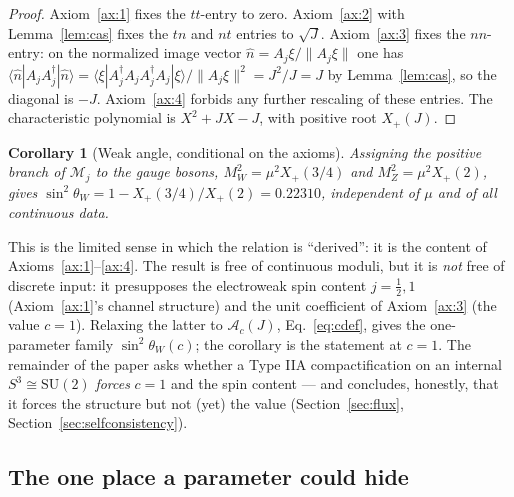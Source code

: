 \documentclass[11pt]{article}
\theoremstyle{plain}
\newtheorem{corollary}[theorem]{Corollary}
\theoremstyle{definition}
\newcommand{\cA}{\mathcal{A}}
\newcommand{\cM}{\mathcal{M}}
\newcommand{\Xp}{X_{+}}
\newcommand{\sinsq}{\sin^{2}\theta_W}
\newcommand{\SU}{\mathrm{SU}}
\begin{document}
\begin{proof}
Axiom~\ref{ax:1} fixes the $tt$-entry to zero. Axiom~\ref{ax:2} with
Lemma~\ref{lem:cas} fixes the $tn$ and $nt$ entries to $\sqrt J$.
Axiom~\ref{ax:3} fixes the $nn$-entry: on the normalized image vector
$\hat n=A_j\xi/\|A_j\xi\|$ one has
$\langle\hat n|A_jA_j^{\dagger}|\hat n\rangle
=\langle\xi|A_j^{\dagger}A_jA_j^{\dagger}A_j|\xi\rangle/\|A_j\xi\|^2
=J^2/J=J$ by Lemma~\ref{lem:cas}, so the diagonal is $-J$.
Axiom~\ref{ax:4} forbids any further rescaling of these entries. The
characteristic polynomial is $X^2+JX-J$, with positive root $\Xp(J)$.
\end{proof}

\begin{corollary}[Weak angle, conditional on the axioms]
\label{cor:angle}
Assigning the positive branch of $\cM_j$ to the gauge bosons,
$M_W^2=\mu^2\Xp(3/4)$ and $M_Z^2=\mu^2\Xp(2)$, gives
$\sinsq=1-\Xp(3/4)/\Xp(2)=0.22310$, independent of $\mu$ and of all
\emph{continuous} data.
\end{corollary}

This is the limited sense in which the relation
is ``derived'': it is the content of Axioms~\ref{ax:1}--\ref{ax:4}. The
result is free of continuous moduli, but it is \emph{not} free of discrete
input: it presupposes the electroweak spin content $j=\tfrac12,1$
(Axiom~\ref{ax:1}'s channel structure) and the unit coefficient of
Axiom~\ref{ax:3} (the value $c=1$). Relaxing the latter to
$\cA_c(J)$, Eq.~\eqref{eq:cdef}, gives the one-parameter family
$\sin^2\theta_W(c)$; the corollary is the statement at $c=1$. The remainder
of the paper asks whether a Type IIA compactification on an internal
$S^3\cong\SU(2)$ \emph{forces} $c=1$ and the spin content --- and concludes,
honestly, that it forces the structure but not (yet) the value
(Section~\ref{sec:flux}, Section~\ref{sec:selfconsistency}).

\subsection{The one place a parameter could hide}
\label{sec:cparam}
\end{document}
